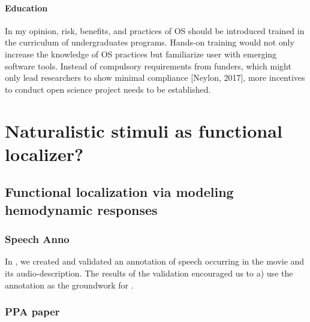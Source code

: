 \paragraph{Education}


In my opinion, risk, benefits, and practices of OS should be introduced trained
in the curriculum of undergraduates programs.
%
Hands-on training would not only increase the knowledge of OS practices but
familiarize user with emerging software tools.
%
Instead of compulsory requirements from funders, which might only lead
researchers to show minimal compliance [Neylon, 2017], more incentives to
conduct open science project needs to be established.


\pagebreak



\section{Naturalistic stimuli as functional localizer?}



\subsection{Functional localization via modeling hemodynamic responses}




\subsubsection{Speech Anno}


In \citep{haeusler2021speechanno}, we created and validated an annotation of
speech occurring in the movie and its audio-description.
The results of the validation encouraged us to a) use the annotation as the
groundwork for \citep{haeusler2022processing}.

\subsubsection{PPA paper}

